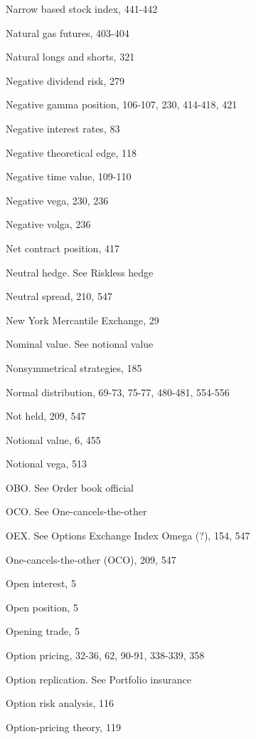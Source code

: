 \noindent Narrow based stock index, 441-442\par
\noindent Natural gas futures, 403-404\par
\noindent Natural longs and shorts, 321\par
\noindent Negative dividend risk, 279\par
\noindent Negative gamma position, 106-107, 230, 414-418, 421\par
\noindent Negative interest rates, 83\par
\noindent Negative theoretical edge, 118\par
\noindent Negative time value, 109-110\par
\noindent Negative vega, 230, 236\par
\noindent Negative volga, 236\par
\noindent Net contract position, 417\par
\noindent Neutral hedge. See Riskless hedge\par
\noindent Neutral spread, 210, 547\par
\noindent New York Mercantile Exchange, 29\par
\noindent Nominal value. See notional value\par
\noindent Nonsymmetrical strategies, 185\par
\noindent Normal distribution, 69-73, 75-77, 480-481, 554-556\par
\noindent Not held, 209, 547\par
\noindent Notional value, 6, 455\par
\noindent Notional vega, 513\par
\noindent OBO. See Order book official\par
\noindent OCO. See One-cancels-the-other\par
\noindent OEX. See Options Exchange Index Omega (?), 154, 547\par
\noindent One-cancels-the-other (OCO), 209, 547\par
\noindent Open interest, 5\par
\noindent Open position, 5\par
\noindent Opening trade, 5\par
\noindent Option pricing, 32-36, 62, 90-91, 338-339, 358\par
\noindent Option replication. See Portfolio insurance\par
\noindent Option risk analysis, 116\par
\noindent Option-pricing theory, 119\par

